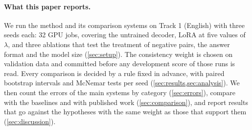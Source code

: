 \paragraph{What this paper reports.} We run the method and its comparison systems on Track 1 (English) with three seeds each: 32 GPU jobs, covering the untrained decoder, LoRA at five values of $\lambda$, and three ablations that test the treatment of negative pairs, the answer format and the model size (\cref{sec:setup}). The consistency weight is chosen on validation data and committed before any development score of those runs is read. Every comparison is decided by a rule fixed in advance, with paired bootstrap intervals and McNemar tests per seed (\cref{sec:results,sec:analysis}). We then count the errors of the main systems by category (\cref{sec:errors}), compare with the baselines and with published work (\cref{sec:comparison}), and report results that go against the hypotheses with the same weight as those that support them (\cref{sec:discussion}).
